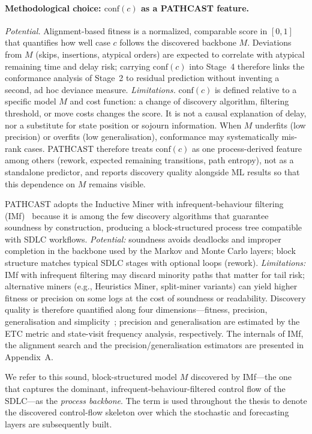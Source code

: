 \paragraph{Methodological choice: $\text{conf}(c)$ as a PATHCAST feature.}
\emph{Potential.} Alignment-based fitness is a normalized, comparable score
in $[0,1]$ that quantifies how well case $c$ follows the discovered backbone
$M$. Deviations from $M$ (skips, insertions, atypical orders) are expected to
correlate with atypical remaining time and delay risk; carrying $\text{conf}(c)$
into Stage~4 therefore links the conformance analysis of Stage~2 to residual
prediction without inventing a second, ad hoc deviance measure.
\emph{Limitations.} $\text{conf}(c)$ is defined relative to a specific model
$M$ and cost function: a change of discovery algorithm, filtering threshold,
or move costs changes the score. It is not a causal explanation of delay, nor
a substitute for state position or sojourn information. When $M$ underfits
(low precision) or overfits (low generalisation), conformance may systematically
mis-rank cases. PATHCAST therefore treats $\text{conf}(c)$ as one process-derived
feature among others (rework, expected remaining transitions, path entropy),
not as a standalone predictor, and reports discovery quality alongside ML
results so that this dependence on $M$ remains visible.

PATHCAST adopts the Inductive Miner with infrequent-behaviour filtering
(IMf)~\cite{leemans2013discovering} because it is among the few discovery
algorithms that guarantee soundness by construction, producing a
block-structured process tree compatible with SDLC workflows.
\emph{Potential:} soundness avoids deadlocks and improper completion in the
backbone used by the Markov and Monte Carlo layers; block structure matches
typical SDLC stages with optional loops (rework).
\emph{Limitations:} IMf with infrequent filtering may discard minority paths
that matter for tail risk; alternative miners (e.g., Heuristics Miner,
split-miner variants) can yield higher fitness or precision on some logs at
the cost of soundness or readability. Discovery quality is therefore
quantified along four dimensions---fitness, precision, generalisation and
simplicity~\cite{aalst2016process}; precision and generalisation are estimated
by the ETC metric and state-visit frequency analysis, respectively. The
internals of IMf, the alignment search and the precision/generalisation
estimators are presented in Appendix~A.

We refer to this sound, block-structured model $M$ discovered by IMf---the
one that captures the dominant, infrequent-behaviour-filtered control flow
of the SDLC---as the \emph{process backbone}. The term is used throughout the
thesis to denote the discovered control-flow skeleton over which the
stochastic and forecasting layers are subsequently built.


